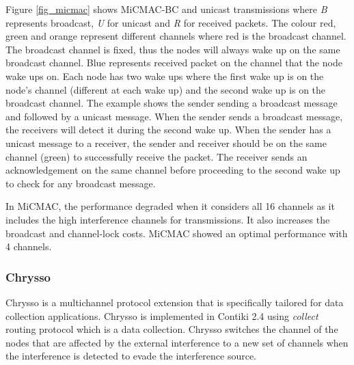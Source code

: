 Figure \ref{fig_micmac} shows MiCMAC-BC and unicast transmissions where \textit{B} represents broadcast, \textit{U} for unicast and \textit{R} for received packets. The colour red, green and orange represent different channels where red is the broadcast channel. The broadcast channel is fixed, thus the nodes will always wake up on the same broadcast channel. Blue represents received packet on the channel that the node wake ups on. Each node has two wake ups where the first wake up is on the node's channel (different at each wake up) and the second wake up is on the broadcast channel. The example shows the sender sending a broadcast message and followed by a unicast message. When the sender sends a broadcast message, the receivers will detect it during the second wake up. 
When the sender has a unicast message to a receiver, the sender and receiver should be on the same channel (green) to successfully receive the packet. The receiver sends an acknowledgement on the same channel before proceeding to the second wake up to check for any broadcast message.

In MiCMAC, the performance degraded when it considers all 16 channels as it includes the high interference channels for transmissions. It also increases the broadcast and channel-lock costs. MiCMAC showed an optimal performance with 4 channels. 



\subsubsection{Chrysso}
Chrysso \cite{chrysso} is a multichannel protocol extension that is specifically tailored for data collection applications. Chrysso is implemented in Contiki 2.4 using \textit{collect} routing protocol which is a data collection. Chrysso switches the channel of the nodes that are affected by the external interference to a new set of channels when the interference is detected to evade the interference source.


